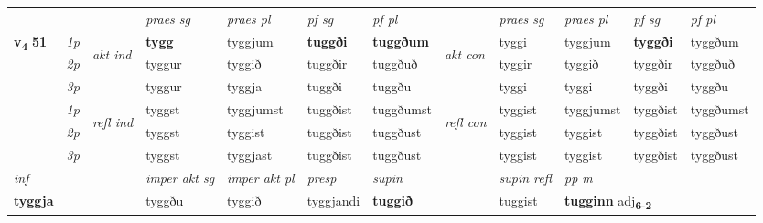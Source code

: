 \begin{longtable}[l]{X>{\footnotesize\itshape}llXXXXlXXXX}
 & &   & \textit{praes sg}  & \textit{praes pl}    & \textit{ pf sg} & \textit{pf pl} & & \textit{praes sg}  & \textit{praes pl}    & \textit{pf sg} & \textit{pf pl }  \\ \cmidrule{4-7} \cmidrule{9-12}
 \multirow{2}{*}{{{\textbf{v{\textsubscript{4}}} \Large{\textbf{51}}}}}  & 1p & \multirow{3}{*}{\begin{turn}{90}\textit{akt ind}\end{turn}} & \textbf{tygg} & tyggjum & \textbf{tuggði} & \textbf{tuggðum} & \multirow{3}{*}{\begin{turn}{90}\textit{akt con}\end{turn}} &tyggi & tyggjum & \textbf{tyggði} & tyggðum\\*
 & 2p &  &  tyggur  & tyggið & tuggðir & tuggðuð & & tyggir & tyggið & tyggðir & tyggðuð \\*
 & 3p &  & tyggur & tyggja & tuggði & tuggðu & & tyggi & tyggi& tyggði & tyggðu \\*
\cmidrule{4-7} \cmidrule{9-12}
 & 1p & \multirow{3}{*}{\begin{turn}{90}\textit{refl ind}\end{turn}}  & tyggst & tyggjumst & tuggðist & tuggðumst & \multirow{3}{*}{\begin{turn}{90}\textit{refl con}\end{turn}}  &tyggist & tyggjumst & tyggðist & tyggðumst \\*
 & 2p &  & tyggst & tyggist & tuggðist & tuggðust & &tyggist & tyggist & tyggðist & tyggðust \\*
 & 3p  & & tyggst & tyggjast & tuggðist & tuggðust & & tyggist & tyggist& tyggðist & tyggðust \\*
\cmidrule{4-7} \cmidrule{9-12}

   {\textit{inf}} & &  & \textit{imper akt sg} & \textit{imper akt pl}   & \textit{presp} & \textit{supin} && \textit{supin refl} & \textit{pp m} \\*
  {\textbf{tyggja}} & && tyggðu  & tyggið   & tyggjandi &  \textbf{tuggið} && tuggist & \multicolumn{2}{l}{\textbf{tugginn} adj\textbf{\textsubscript{6-2}}} \\*

\midrule


\end{longtable}
